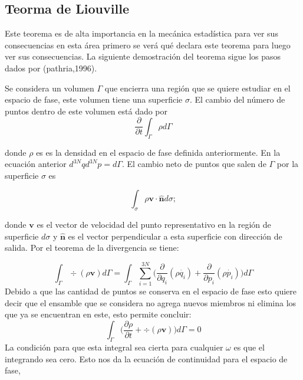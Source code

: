 \subsection{Teorma de Liouville }
Este teorema es de alta importancia en la mecánica estadística para ver sus consecuencias en esta área primero se verá qué declara este teorema para luego ver sus consecuencias. La siguiente demostración del teorema sigue los pasos dados por (pathria,1996). 

Se considera un volumen $\Gamma$ que encierra una región que se quiere estudiar en el espacio de fase,  este volumen tiene una superficie $\sigma$. El cambio del número de puntos dentro de este volumen está dado por 
\begin{equation}
\frac{\partial}{\partial t} \int_{\Gamma} \rho d\Gamma
\end{equation}

donde $\rho$ es es la densidad en el espacio de fase definida anteriormente. En la ecuación anterior $d^{3N}q d^{3N}p=d\Gamma$. 
El cambio neto de puntos que salen de $\Gamma$ por la superficie $\sigma$ es

\begin{equation}
\int_{\sigma} \rho \mathbf{v \cdot \hat{n}} d\sigma;
\end{equation}

donde $\mathbf{v}$ es el vector de velocidad del punto representativo en la región de superficie $d\sigma$ y $\mathbf{\hat{n}}$ es el vector perpendicular a esta superficie con dirección de salida. Por el teorema de la divergencia se tiene:

\begin{equation}
\int_{\Gamma} \div{ ( \rho\mathbf{v} ) } d\Gamma = \int_{\Gamma} \sum_{i=1}^{3N} \Big( \frac{\partial}{\partial q_{i}}(\rho \dot{q_{i}})+ \frac{\partial}{\partial p_{i}} (\rho \dot{p_{i}}) \Big) d\Gamma
\end{equation}
Debido a que las cantidad de puntos se conserva en el espacio de fase esto quiere decir que el ensamble que se considera no agrega nuevos miembros ni elimina los que ya se encuentran en este, esto permite concluir:
\begin{equation}
 \int_{\Gamma} \Big( \frac{\partial \rho}{\partial t} + \div{ ( \rho\mathbf{v} ) } \Big) d\Gamma =0
\end{equation}
La condición para que esta integral sea cierta para cualquier $\omega$ es que el integrando sea cero. Esto nos da la ecuación de continuidad para el espacio de fase,

